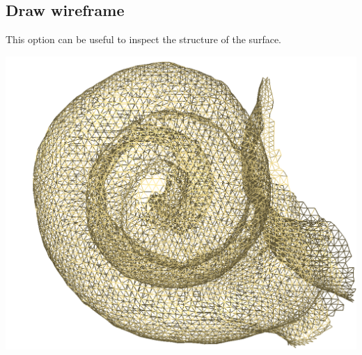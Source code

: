 \noindent
\begin{minipage}{0.55\textwidth}

\subsection{Draw wireframe}
This option can be useful to inspect the structure of the surface.

\end{minipage}  
 \begin{minipage}{0.45\textwidth}\centering

\includegraphics[scale=0.1]{images/Viewing_options/wireframe.png}

 \end{minipage} 
\noindent

